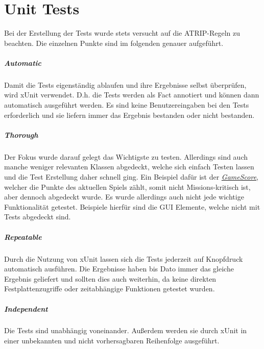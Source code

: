 \chapter{Unit Tests}

Bei der Erstellung der Tests wurde stets versucht auf die ATRIP-Regeln zu beachten. Die einzelnen Punkte sind im folgenden genauer aufgeführt.

\paragraph{Automatic}
Damit die Tests eigenständig ablaufen und ihre Ergebnisse selbst überprüfen, wird xUnit verwendet. D.h. die Tests werden als \glqq Fact\grqq{} annotiert und können dann automatisch ausgeführt werden. Es sind keine Benutzereingaben bei den Tests erforderlich und sie liefern immer das Ergebnis \glqq bestanden\grqq{} oder \glqq nicht bestanden\grqq{}.

\paragraph{Thorough}
Der Fokus wurde darauf gelegt das Wichtigste zu testen. Allerdings sind auch manche weniger relevanten Klassen abgedeckt, welche sich einfach Testen lassen und die Test Erstellung daher schnell ging. Ein Beispiel dafür ist der \href{https://github.com/EinToni/Wortfinder/blob/main/Wortfinder/GameScore.cs}{\textit{GameScore}}, welcher die Punkte des aktuellen Spiels zählt, somit nicht Missions-kritisch ist, aber dennoch abgedeckt wurde. Es wurde allerdings auch nicht jede wichtige Funktionalität getestet. Beispiele hierfür sind die GUI Elemente, welche nicht mit Tests abgedeckt sind.

\paragraph{Repeatable}
Durch die Nutzung von xUnit lassen sich die Tests jederzeit auf Knopfdruck automatisch ausführen. Die Ergebnisse haben bis Dato immer das gleiche Ergebnis geliefert und sollten dies auch weiterhin, da keine direkten Festplattenzugriffe oder zeitabhängige Funktionen getestet wurden. 

\paragraph{Independent}
Die Tests sind unabhängig voneinander. Außerdem werden sie durch xUnit in einer unbekannten und nicht vorhersagbaren Reihenfolge ausgeführt.

